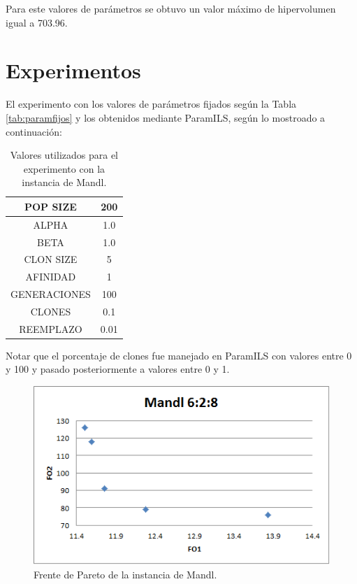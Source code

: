 Para este valores de parámetros se obtuvo un valor máximo de hipervolumen igual a 703.96.

\section{Experimentos}

El experimento con los valores de parámetros fijados según la Tabla \ref{tab:paramfijos} y los obtenidos mediante ParamILS, según lo mostroado a continuación:

\begin{table}[!htb]
\begin{center}
\begin{tabular}{|c|c|}
\hline
POP SIZE & 200\\ \hline
ALPHA & 1.0\\ \hline
BETA & 1.0\\ \hline
CLON SIZE & 5\\ \hline
AFINIDAD & 1\\ \hline
GENERACIONES & 100\\ \hline
CLONES & 0.1\\ \hline
REEMPLAZO & 0.01\\ \hline
\end{tabular}
\caption{Valores utilizados para el experimento con la instancia de Mandl.}
\end{center}
\end{table}

Notar que el porcentaje de clones fue manejado en ParamILS con valores entre 0 y 100 y pasado posteriormente a valores entre 0 y 1.

\begin{figure}[!htb]
\begin{center}
\includegraphics[scale=0.7]{pareto_mandl.png}
\caption{Frente de Pareto de la instancia de Mandl.}
\label{fig:pareto_mandl}
\end{center}
\end{figure}

